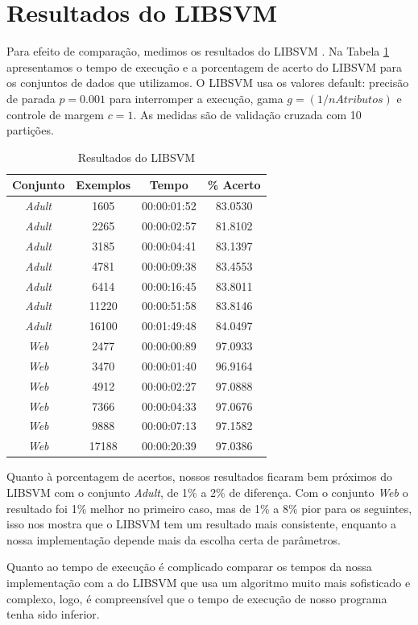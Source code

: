 \section{Resultados do LIBSVM}

Para efeito de comparação, medimos os resultados do LIBSVM \cite{art:LIBSVM}. Na Tabela \ref{tab:libsvmResults} apresentamos o tempo de execução e a porcentagem de acerto do LIBSVM para os conjuntos de dados que utilizamos. O LIBSVM usa os valores default: precisão de parada $p=0.001$ para interromper a execução, gama $g=(1/nAtributos)$ e controle de margem $c=1$. As medidas são de validação cruzada com 10 partições.
\begin{table}
    \caption{Resultados do LIBSVM}
    \label{tab:libsvmResults}
    \small
    \centering
    \begin{tabular}{|c|c|c|c|} \hline
        Conjunto & Exemplos & Tempo & \% Acerto \\ \hline
        \em{Adult} & 1605 & 00:00:01:52 & 83.0530 \\ \hline
        \em{Adult} & 2265 &  00:00:02:57 & 81.8102 \\ \hline
        \em{Adult} & 3185 &  00:00:04:41 & 83.1397 \\ \hline
        \em{Adult} & 4781 & 00:00:09:38 & 83.4553 \\ \hline
        \em{Adult} & 6414 & 00:00:16:45 & 83.8011 \\ \hline
        \em{Adult} & 11220 & 00:00:51:58 & 83.8146 \\ \hline
        \em{Adult} & 16100 & 00:01:49:48 & 84.0497 \\ \hline
        \em{Web} & 2477 & 00:00:00:89 & 97.0933 \\ \hline
        \em{Web} & 3470 & 00:00:01:40 & 96.9164 \\ \hline
        \em{Web} & 4912 & 00:00:02:27 & 97.0888 \\ \hline
        \em{Web} & 7366 & 00:00:04:33 & 97.0676 \\ \hline
        \em{Web} & 9888 & 00:00:07:13 & 97.1582 \\ \hline
        \em{Web} & 17188 & 00:00:20:39 & 97.0386 \\ \hline
    \end{tabular}
\end{table}

Quanto à porcentagem de acertos, nossos resultados ficaram bem próximos do LIBSVM com o conjunto {\em Adult}, de 1\% a 2\% de diferença. Com o conjunto {\em Web} o resultado foi 1\% melhor no primeiro caso, mas de 1\% a 8\% pior para os seguintes, isso nos mostra que o LIBSVM tem um resultado mais consistente, enquanto a nossa implementação depende mais da escolha certa de parâmetros.

Quanto ao tempo de execução é complicado comparar os tempos da nossa implementação com a do LIBSVM que usa um algoritmo muito mais sofisticado e complexo, logo, é compreensível que o tempo de execução de nosso programa tenha sido inferior.